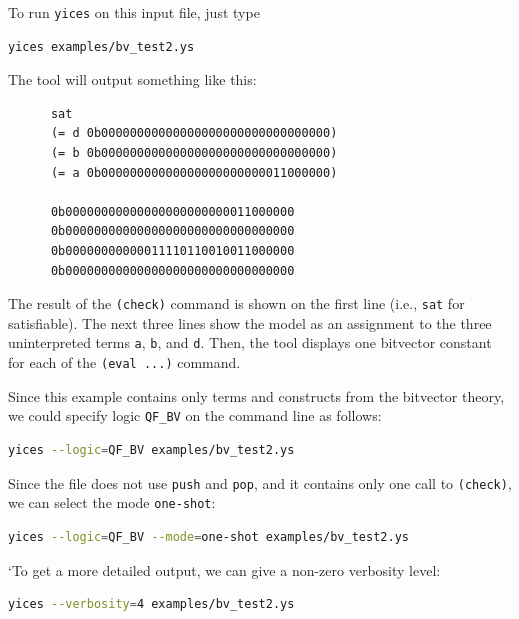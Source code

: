 \documentclass[11pt,twoside,fleqn,openright,titlepage]{cslreport}
\begin{document}
\medskip\noindent
To run \texttt{yices} on this input file, just type
\begin{small}
\begin{lstlisting}[language=sh]
   yices examples/bv_test2.ys
\end{lstlisting}
\end{small}
The tool will output something like this:
\begin{small}
\begin{verbatim}
      sat
      (= d 0b00000000000000000000000000000000)
      (= b 0b00000000000000000000000000000000)
      (= a 0b00000000000000000000000011000000)

      0b00000000000000000000000011000000
      0b00000000000000000000000000000000
      0b00000000000011110110010011000000
      0b00000000000000000000000000000000
\end{verbatim}
\end{small}
The result of the \texttt{(check)}  command is shown on the first line
(i.e., \texttt{sat}  for satisfiable). The  next three lines  show the
model as  an assignment to  the three uninterpreted  terms \texttt{a},
\texttt{b},  and \texttt{d}.  Then,  the tool  displays one  bitvector
constant for each of the \texttt{(eval ...)} command.

\medskip\noindent
Since  this  example  contains  only  terms and  constructs  from  the
bitvector  theory,  we  could  specify logic  \texttt{QF\_BV}  on  the
command line as follows:
\begin{small}
\begin{lstlisting}[language=sh]
   yices --logic=QF_BV examples/bv_test2.ys
\end{lstlisting}
\end{small}
Since the file does not use \texttt{push} and \texttt{pop}, and it
contains only one call to \texttt{(check)}, we can select the mode
\texttt{one-shot}:
\begin{small}
\begin{lstlisting}[language=sh]
   yices --logic=QF_BV --mode=one-shot examples/bv_test2.ys
\end{lstlisting}
\end{small}
`To get a more detailed output, we can give a non-zero verbosity level:
\begin{small}
\begin{lstlisting}[language=sh]
   yices --verbosity=4 examples/bv_test2.ys
\end{lstlisting}
\end{small}
\end{document}

